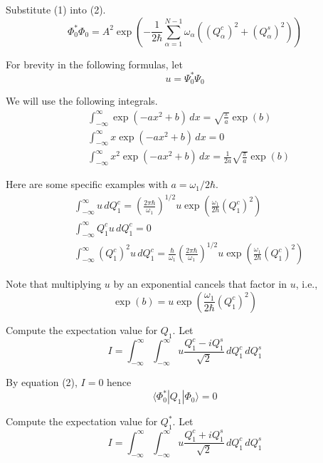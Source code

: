 \documentclass[12pt]{article}
\begin{document}
Substitute (1) into (2).
\begin{equation*}
\Phi_0^*\Phi_0
=A^2\exp\left(
-\frac{1}{2\hbar}
\sum_{\alpha=1}^{N-1}
\omega_\alpha\left((Q_\alpha^c)^2+(Q_\alpha^s)^2\right)
\right)
\end{equation*}

For brevity in the following formulas, let
\begin{equation*}
u=\Psi_0^*\Psi_0
\end{equation*}

We will use the following integrals.
\begin{align*}
&\int_{-\infty}^\infty\exp(-ax^2+b)\,dx=\sqrt{\frac{\pi}{a}}\exp(b)
\tag{1}
\\
&\int_{-\infty}^\infty x\exp(-ax^2+b)\,dx=0
\tag{2}
\\
&\int_{-\infty}^\infty x^2\exp(-ax^2+b)\,dx=\frac{1}{2a}\sqrt{\frac{\pi}{a}}\exp(b)
\tag{3}
\end{align*}

Here are some specific examples with $a=\omega_1/2\hbar$.
\begin{align*}
&\int_{-\infty}^\infty u\,dQ_1^c=\left(\frac{2\pi\hbar}{\omega_1}\right)^{1/2}
u\exp\left(\frac{\omega_1}{2\hbar}(Q_1^c)^2\right)
\tag{4}
\\
&\int_{-\infty}^\infty Q_1^cu\,dQ_1^c=0
\tag{5}
\\
&\int_{-\infty}^\infty (Q_1^c)^2u\,dQ_1^c=\frac{\hbar}{\omega_1}
\left(\frac{2\pi\hbar}{\omega_1}\right)^{1/2}
u\exp\left(\frac{\omega_1}{2\hbar}(Q_1^c)^2\right)
\tag{6}
\end{align*}

Note that multiplying $u$ by an exponential cancels that factor in $u$, i.e.,
\begin{equation*}
\exp(b)=u\exp\left(\frac{\omega_1}{2\hbar}(Q_1^c)^2\right)
\end{equation*}

Compute the expectation value for $Q_1$.
Let
\begin{equation*}
I=\int_{-\infty}^\infty\int_{-\infty}^\infty
u\frac{Q_1^c-iQ_1^s}{\sqrt2}
\,dQ_1^c\,dQ_1^s
\end{equation*}

By equation (2), $I=0$ hence
\begin{equation*}
\langle\Phi_0^*|Q_1|\Phi_0\rangle=0
\end{equation*}

Compute the expectation value for $Q_1^*$.
Let
\begin{equation*}
I=\int_{-\infty}^\infty\int_{-\infty}^\infty
u\frac{Q_1^c+iQ_1^s}{\sqrt2}
\,dQ_1^c\,dQ_1^s
\end{equation*}
\end{document}
